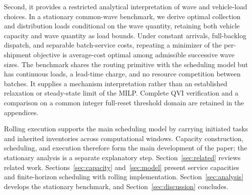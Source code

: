 Second, it provides a restricted analytical interpretation of wave and vehicle-load choices. In a stationary common-wave benchmark, we derive optimal collection and distribution loads conditional on the wave quantity, retaining both vehicle capacity and wave quantity as load bounds. Under constant arrivals, full-backlog dispatch, and separable batch-service costs, repeating a minimizer of the per-shipment objective is average-cost optimal among admissible successive wave sizes. The benchmark shares the routing primitive with the scheduling model but has continuous loads, a lead-time charge, and no resource competition between batches. It supplies a mechanism interpretation rather than an established relaxation or steady-state limit of the MILP. Complete QVI verification and a comparison on a common integer full-reset threshold domain are retained in the appendices.

Rolling execution supports the main scheduling model by carrying initiated tasks and inherited inventories across computational windows. Capacity construction, scheduling, and execution therefore form the main development of the paper; the stationary analysis is a separate explanatory step. Section~\ref{sec:related} reviews related work. Sections~\ref{sec:capacity} and~\ref{sec:model} present service capacities and finite-horizon scheduling with rolling implementation. Section~\ref{sec:analysis} develops the stationary benchmark, and Section~\ref{sec:discussion} concludes.
